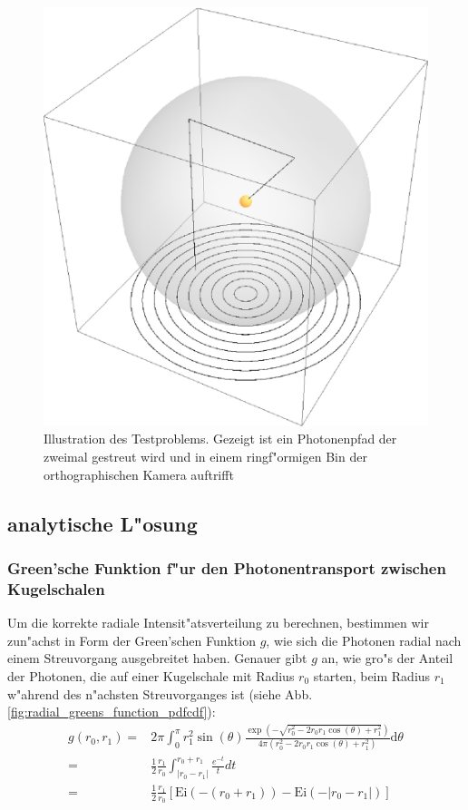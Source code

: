 	\begin{figure}
			\centering
			\includegraphics[height=0.45\textheight]{testproblem_illustration.eps}
			\caption{Illustration des Testproblems. Gezeigt ist ein Photonenpfad der zweimal gestreut wird und in einem ringf"ormigen Bin der orthographischen Kamera auftrifft}
			\label{fig:testproblem_sketch}
	\end{figure}

	
	\subsection{analytische L"osung}\label{subsec:homsphere_analytic_solution}
	\subsubsection{Green'sche Funktion f"ur den Photonentransport zwischen Kugelschalen}
	Um die korrekte radiale Intensit"atsverteilung zu berechnen, bestimmen wir zun"achst in Form der Green'schen Funktion $g$, wie sich die Photonen radial nach einem Streuvorgang ausgebreitet haben.
	Genauer gibt $g$ an, wie gro"s der Anteil der Photonen, die auf einer Kugelschale mit Radius $r_0$ starten, beim Radius $r_1$ w"ahrend des n"achsten Streuvorganges ist (siehe Abb. \ref{fig:radial_greens_function_pdfcdf}):
	\begin{align*}
		g(r_0,r_1) =& 2 \pi \int_0^\pi r_1^2 \sin(\theta) \frac{\exp\left(-\sqrt{r_0^2-2 r_0 r_1 \cos(\theta)+r_1^2}\right)}{4 \pi (r_0^2-2 r_0 r_1 \cos(\theta)+r_1^2)} \text{d}\theta \\
		=& \frac{1}{2}\frac{r_1}{r_0} \int_{|r_0-r_1|}^{r_0+r_1} \frac{e^{-t}}{t} dt \\
		=& \frac{1}{2}\frac{r_1}{r_0}\left[\text{Ei}(-(r_0+r_1)) - \text{Ei}(-|r_0-r_1|)\right]
	\end{align*}
	
